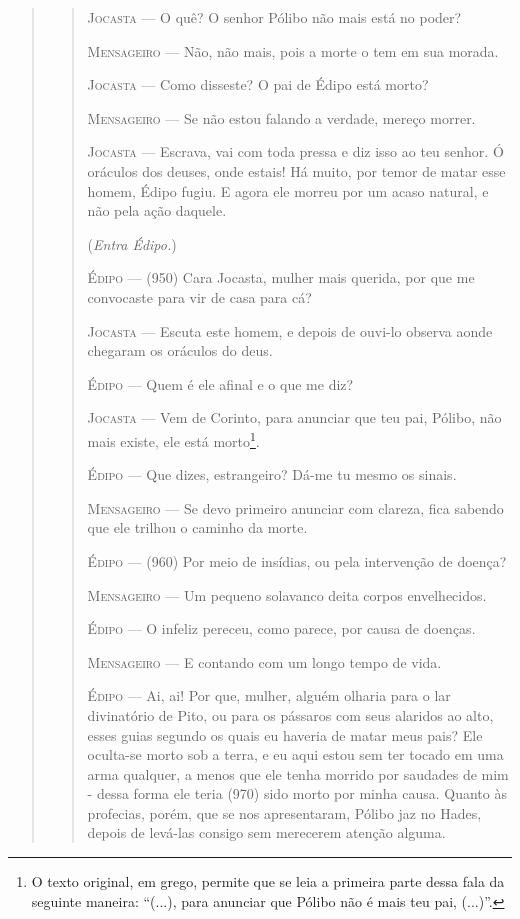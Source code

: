 \begin{verse}
\begin{verse}
\textsc{Jocasta} --- O quê? O senhor Pólibo não mais está no poder?

\textsc{Mensageiro} --- Não, não mais, pois a morte o tem em sua morada.

\textsc{Jocasta} --- Como disseste? O pai de Édipo está morto?

\textsc{Mensageiro} --- Se não estou falando a verdade, mereço morrer.

\textsc{Jocasta} --- Escrava, vai com toda pressa e diz isso ao teu senhor. Ó oráculos dos
deuses, onde estais! Há muito, por temor de matar esse homem, Édipo
fugiu. E agora ele morreu por um acaso natural, e não pela ação daquele.

(\emph{Entra Édipo.})

\textsc{Édipo} --- (950) Cara Jocasta, mulher mais querida, por que me convocaste para vir
de casa para cá?

\textsc{Jocasta} --- Escuta este homem, e depois de ouvi-lo observa aonde chegaram os
oráculos do deus.

\textsc{Édipo} --- Quem é ele afinal e o que me diz?

\textsc{Jocasta} --- Vem de Corinto, para anunciar que teu pai, Pólibo, não mais existe, ele
está morto\footnote{O texto original, em grego, permite que se leia a
  primeira parte dessa fala da seguinte maneira: ``(...), para anunciar
  que Pólibo não é mais teu pai, (...)''.}.

\textsc{Édipo} --- Que dizes, estrangeiro? Dá-me tu mesmo os sinais.

\textsc{Mensageiro} --- Se devo primeiro anunciar com clareza, fica sabendo que ele trilhou o
caminho da morte.

\textsc{Édipo} --- (960) Por meio de insídias, ou pela intervenção de doença?

\textsc{Mensageiro} --- Um pequeno solavanco deita corpos envelhecidos.

\textsc{Édipo} --- O infeliz pereceu, como parece, por causa de doenças.

\textsc{Mensageiro} --- E contando com um longo tempo de vida.

\textsc{Édipo} --- Ai, ai! Por que, mulher, alguém olharia para o lar divinatório de Pito,
ou para os pássaros com seus alaridos ao alto, esses guias segundo os
quais eu haveria de matar meus pais? Ele oculta-se morto sob a terra, e
eu aqui estou sem ter tocado em uma arma qualquer, a menos que ele tenha
morrido por saudades de mim - dessa forma ele teria (970) sido morto por
minha causa. Quanto às profecias, porém, que se nos apresentaram, Pólibo
jaz no Hades, depois de levá-las consigo sem merecerem atenção alguma.


\end{verse}
\end{verse}
